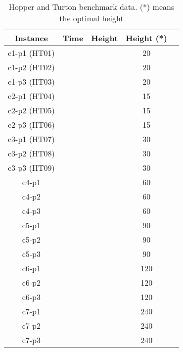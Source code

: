 \begin{table}[h!t]
    \centering
    \small
    \begin{tabular}{|c|c|c|c|c|}
        \hline
        \textbf{Instance} & \textbf{Time} & \textbf{Height} & \textbf{Height (*)} \\ \hline
        c1-p1 (HT01)      &               &                 & 20                  \\ \hline
        c1-p2 (HT02)      &               &                 & 20                  \\ \hline
        c1-p3 (HT03)      &               &                 & 20                  \\ \hline
        c2-p1 (HT04)      &               &                 & 15                  \\ \hline
        c2-p2 (HT05)      &               &                 & 15                  \\ \hline
        c2-p3 (HT06)      &               &                 & 15                  \\ \hline
        c3-p1 (HT07)      &               &                 & 30                  \\ \hline
        c3-p2 (HT08)      &               &                 & 30                  \\ \hline
        c3-p3 (HT09)      &               &                 & 30                  \\ \hline
        c4-p1             &               &                 & 60                  \\ \hline
        c4-p2             &               &                 & 60                  \\ \hline
        c4-p3             &               &                 & 60                  \\ \hline
        c5-p1             &               &                 & 90                  \\ \hline
        c5-p2             &               &                 & 90                  \\ \hline
        c5-p3             &               &                 & 90                  \\ \hline
        c6-p1             &               &                 & 120                 \\ \hline
        c6-p2             &               &                 & 120                 \\ \hline
        c6-p3             &               &                 & 120                 \\ \hline
        c7-p1             &               &                 & 240                 \\ \hline
        c7-p2             &               &                 & 240                 \\ \hline
        c7-p3             &               &                 & 240                 \\ \hline
    \end{tabular}
    \label{tab:results}
    \caption{Hopper and Turton benchmark data. (*) means the optimal height}
\end{table}
